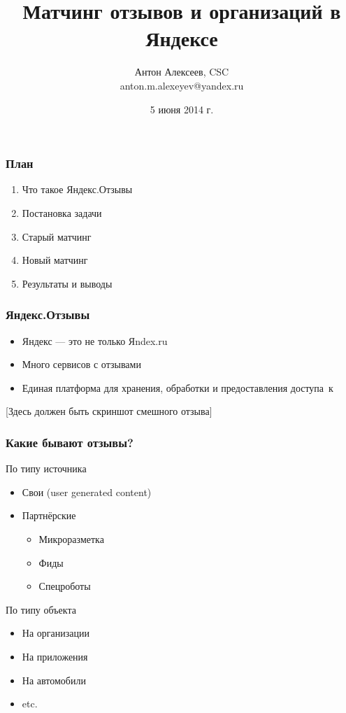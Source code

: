 \documentclass{beamer}
\title{ Матчинг отзывов и организаций в Яндексе }
\institute{Яндекс.Отзывы}
\author{{\small Антон Алексеев, CSC\\anton.m.alexeyev@yandex.ru\\}}
\date{5 июня 2014 г.}
\begin{document}

{
\frame{\titlepage}
}

\begin{frame}\frametitle{План}
    \begin{enumerate}
        \item Что такое Яндекс.Отзывы
        \item Постановка задачи
        \item Старый матчинг
        \item Новый матчинг
        \item Результаты и выводы
    \end{enumerate}
\end{frame}


\begin{frame}\frametitle{Яндекс.Отзывы}

\begin{itemize}
\item Яндекс --- это не только {\color{red}Я}ndex.ru
\item Много сервисов с отзывами
\item Единая платформа для хранения, обработки и предоставления доступа~к
\end{itemize}

[Здесь должен быть скриншот смешного отзыва]

\end{frame}


\begin{frame} \frametitle{Какие бывают отзывы?}
	По типу источника
	\begin{itemize}
	\item Свои (user generated content)
	\item Партнёрские
		\begin{itemize}
		\item Микроразметка \item Фиды \item Спецроботы
		\end{itemize}
	\end{itemize}
        По типу объекта
	\begin{itemize}
	\item На организации \item На приложения \item На автомобили \item etc.
	\end{itemize}
\end{frame}
\end{document}
